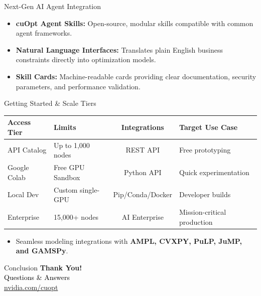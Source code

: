 \documentclass[aspectratio=169]{beamer}
\begin{document}
\begin{frame}{Next-Gen AI Agent Integration}
    \begin{itemize}
        \item \textbf{cuOpt Agent Skills:} Open-source, modular skills compatible with common agent frameworks.
        \item \textbf{Natural Language Interfaces:} Translates plain English business constraints directly into optimization models.
        \item \textbf{Skill Cards:} Machine-readable cards providing clear documentation, security parameters, and performance validation.
    \end{itemize}
\end{frame}

\begin{frame}{Getting Started \& Scale Tiers}
    \centering
    \begin{tabular}{llcl}
        \toprule
        \textbf{Access Tier} & \textbf{Limits} & \textbf{Integrations} & \textbf{Target Use Case} \\
        \midrule
        API Catalog & Up to 1,000 nodes & REST API & Free prototyping \\
        Google Colab & Free GPU Sandbox & Python API & Quick experimentation \\
        Local Dev & Custom single-GPU & Pip/Conda/Docker & Developer builds \\
        Enterprise & 15,000+ nodes & AI Enterprise & Mission-critical production \\
        \bottomrule
    \end{tabular}
    \vspace{0.4cm}
    \begin{itemize}
        \item Seamless modeling integrations with \textbf{AMPL, CVXPY, PuLP, JuMP, and GAMSPy}.
    \end{itemize}
\end{frame}

\begin{frame}{Conclusion}
    \centering
    \Huge \textcolor{NVIDIAGreen}{\textbf{Thank You!}} \\
    \vspace{0.5cm}
    \Large \textcolor{black}{Questions \& Answers} \\
    \vspace{0.8cm}
    \small \href{https://www.nvidia.com/en-us/ai-data-science/products/cuopt/}{nvidia.com/cuopt}
\end{frame}
\end{document}

